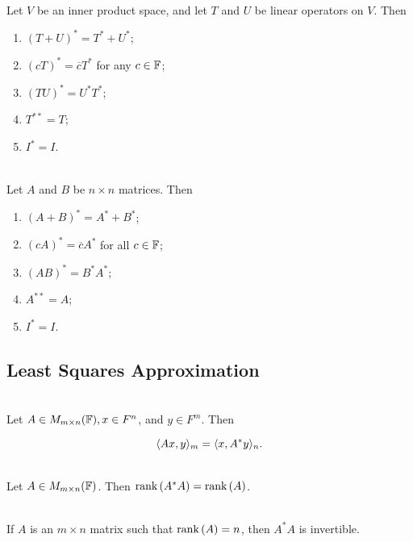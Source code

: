 \begin{theorem}
	\hfill\\
	Let $V$ be an inner product space, and let $T$ and $U$ be linear operators on $V$. Then

	\begin{enumerate}
		\item $(T+U)^* = T^* + U^*$;
		\item $(cT)^* = \overline{c}T^*$ for any $c \in \mathbb{F}$;
		\item $(TU)^* = U^*T^*$;
		\item $T^{**} = T$;
		\item $I^* = I$.
	\end{enumerate}
\end{theorem}

\begin{corollary}
	\hfill\\
	Let $A$ and $B$ be $n \times n$ matrices. Then

	\begin{enumerate}
		\item $(A + B)^* = A^* + B^*$;
		\item $(cA)^* = \overline{c}A^*$ for all $c \in \mathbb{F}$;
		\item $(AB)^* = B^*A^*$;
		\item $A^{**} = A$;
		\item $I^* = I$.
	\end{enumerate}
\end{corollary}

\subsection*{Least Squares Approximation}

\begin{lemma}
	\hfill\\
	Let $A \in M_{m \times n}(\mathbb{F}), x \in F^n$, and $y \in F^m$. Then

	\[\langle Ax,y\rangle_m = \langle x,A^*y\rangle_n.\]
\end{lemma}

\begin{lemma}
	\hfill\\
	Let $A \in M_{m \times n}(\mathbb{F})$. Then $\text{rank}\left(A^*A\right) = \text{rank}\left(A\right)$.
\end{lemma}

\begin{corollary}
	\hfill\\
	If $A$ is an $m \times n$ matrix such that $\text{rank}\left(A\right) = n$, then $A^*A$ is invertible.
\end{corollary}

